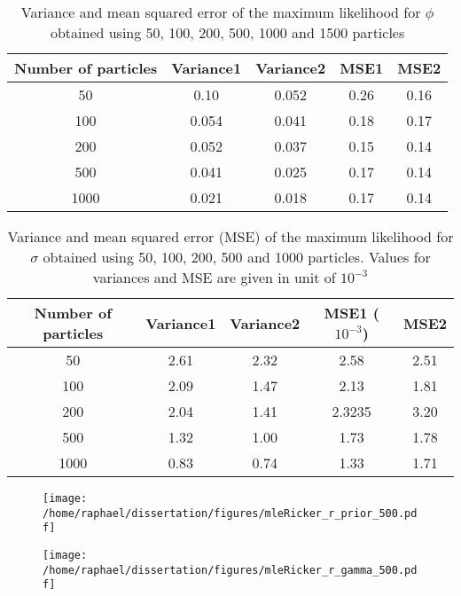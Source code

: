 \documentclass[12pt]{article}
\newcommand{\ra}[1]{\renewcommand{\arraystretch}{#1}}
\begin{document}
	\begin{table}[htb]
		\centering
		\ra{1.3}
		\begin{tabular}{@{}ccccc@{}} \toprule
			Number of particles & Variance1 &  Variance2 & MSE1 & MSE2 \\ \midrule
			50 & 0.10 & 0.052 & 0.26 & 0.16\\
			100 & 0.054 & 0.041 & 0.18 & 0.17\\ 
			200 & 0.052 & 0.037 & 0.15 & 0.14\\ 
			500 & 0.041 & 0.025 & 0.17 & 0.14\\
			1000 & 0.021 & 0.018 & 0.17 & 0.14 \\ \bottomrule
		\end{tabular}
		\caption{Variance and mean squared error of the maximum likelihood for $\phi$ obtained using 50, 100, 200, 500, 1000 and 1500 particles}
		\label{table:mlePhi}
	\end{table}

	\begin{table}[htb]
		\centering
		\ra{1.3}
		\begin{tabular}{@{}ccccc@{}} \toprule
			Number of particles & Variance1 &  Variance2 & MSE1 ($10^{-3}$)& MSE2\\ \midrule
			50 & 2.61 & 2.32 & 2.58 & 2.51\\
			100 & 2.09 & 1.47 & 2.13 & 1.81\\
			200 & 2.04 & 1.41 &  2.3235  & 3.20\\ 
			500 & 1.32 & 1.00 & 1.73 & 1.78\\
			1000 & 0.83 & 0.74 & 1.33 & 1.71 \\  \bottomrule
		\end{tabular}
		\caption{Variance and mean squared error (MSE) of the maximum likelihood for $\sigma$ obtained using 50, 100, 200, 500 and 1000 particles. Values for variances and MSE are given in unit of $10^{-3}$}
		\label{table:mleSigma}
	\end{table}

	\begin{figure}[htb]
		\centering
		\begin{minipage}{0.4\textwidth}
			\centering
			\texttt{[image: /home/raphael/dissertation/figures/mleRicker\_r\_prior\_500.pdf]}
		\end{minipage}
		\begin{minipage}{0.4\textwidth}
			\centering
			\texttt{[image: /home/raphael/dissertation/figures/mleRicker\_r\_gamma\_500.pdf]}
		\end{minipage}
		\caption{}
		\label{fig:comparisonR}
	\end{figure}
	
\end{document}

